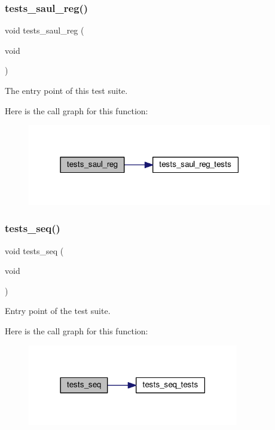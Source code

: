 \subsubsection{\texorpdfstring{tests\+\_\+saul\+\_\+reg()}{tests\_saul\_reg()}}
{\footnotesize\ttfamily void tests\+\_\+saul\+\_\+reg (\begin{DoxyParamCaption}\item[{void}]{ }\end{DoxyParamCaption})}



The entry point of this test suite. 

Here is the call graph for this function\+:
\nopagebreak
\begin{figure}[H]
\begin{center}
\leavevmode
\includegraphics[width=303pt]{group__unittests_gaeae46a0be227b9113311165fc3b3752b_cgraph}
\end{center}
\end{figure}
\mbox{\label{group__unittests_gaad689d0f2a9566f1cc70188eabdfd24c}} 
\subsubsection{\texorpdfstring{tests\+\_\+seq()}{tests\_seq()}}
{\footnotesize\ttfamily void tests\+\_\+seq (\begin{DoxyParamCaption}\item[{void}]{ }\end{DoxyParamCaption})}



Entry point of the test suite. 

Here is the call graph for this function\+:
\nopagebreak
\begin{figure}[H]
\begin{center}
\leavevmode
\includegraphics[width=261pt]{group__unittests_gaad689d0f2a9566f1cc70188eabdfd24c_cgraph}
\end{center}
\end{figure}
\mbox{\label{group__unittests_gab1ea4d232c2abb95e5705f20432f3e07}} 
